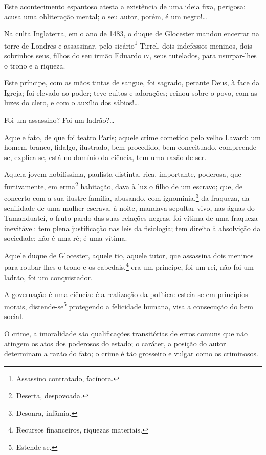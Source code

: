 Este acontecimento espantoso atesta a existência de uma ideia fixa,
perigosa: acusa uma obliteração mental; o seu autor, porém, é um
negro!\ldots{}

\asterisc

Na culta Inglaterra, em o ano de 1483, o duque de Glocester mandou
encerrar na torre de Londres e assassinar, pelo sicário\footnote{
  Assassino contratado, facínora.} Tirrel, dois indefessos meninos, dois
sobrinhos seus, filhos do seu irmão Eduardo \textsc{iv}, seus tutelados, para
usurpar-lhes o trono e a riqueza.

Este príncipe, com as mãos tintas de sangue, foi sagrado, perante Deus,
à face da Igreja; foi elevado ao poder; teve cultos e adorações; reinou
sobre o povo, com as luzes do clero, e com o auxílio dos sábios!\ldots{}

Foi um assassino? Foi um ladrão?\ldots{}

\asterisc

Aquele fato, de que foi teatro Paris; aquele crime cometido pelo velho
Lavard: um homem branco, fidalgo, ilustrado, bem procedido, bem
conceituado, compreende-se, explica-se, está no domínio da ciência, tem
uma razão de ser.

Aquela jovem nobilíssima, paulista distinta, rica, importante, poderosa,
que furtivamente, em erma\footnote{Deserta, despovoada.} habitação,
dava à luz o filho de um escravo; que, de concerto com a sua ilustre
família, abusando, com ignomínia,\footnote{Desonra, infâmia.} da
fraqueza, da senilidade de uma mulher escrava, à noite, mandava sepultar
vivo, nas águas do Tamanduateí, o fruto pardo das suas relações negras,
foi vítima de uma fraqueza inevitável: tem plena justificação nas leis
da fisiologia; tem direito à absolvição da sociedade; não é uma ré; é
uma vítima.

Aquele duque de Glocester, aquele tio, aquele tutor, que assassina dois
meninos para roubar-lhes o trono e os cabedais,\footnote{Recursos
  financeiros, riquezas materiais.} era um príncipe, foi um rei, não
foi um ladrão, foi um conquistador.

A governação é uma ciência: é a realização da política: esteia-se em
princípios morais, distende-se\footnote{Estende-se.} protegendo a
felicidade humana, visa a consecução do bem social.

O crime, a imoralidade são qualificações transitórias de erros comuns
que não atingem os atos dos poderosos do estado; o caráter, a posição do
autor determinam a razão do fato; o crime é tão grosseiro e vulgar como
os criminosos.

